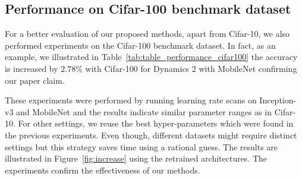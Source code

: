 \documentclass{ieeeaccess}
\begin{document}
\subsection{Performance on Cifar-100 benchmark dataset}
For a better evaluation of our proposed methods, apart from Cifar-10, we also performed experiments on the Cifar-100 benchmark dataset. In fact, as an example, we illustrated in Table~\ref{tab:table_performance_cifar100} the accuracy is increased by $2.78\%$ with Cifar-100 for Dynamics 2 with MobileNet confirming our paper claim.

These experiments were performed by running learning rate scans on Inception-v3 and MobileNet and the results indicate similar parameter ranges as in Cifar-10. For other settings, we reuse the best hyper-parameters which were found in the previous experiments. Even though, different datasets might require distinct settings but this strategy saves time using a rational guess. The results are illustrated in Figure~\ref{fig:increase} using the retrained architectures. The experiments confirm the effectiveness of our methods.
\end{document}
